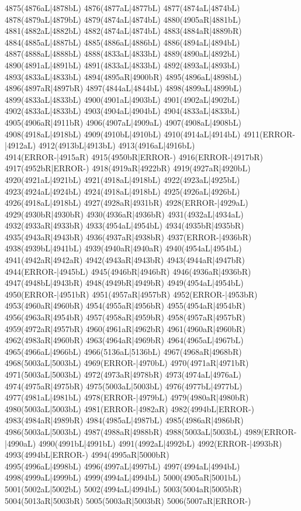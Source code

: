 4875(4876aL|4878bL) 4876(4877aL|4877bL) 4877(4874aL|4874bL) \\4878(4879aL|4879bL) 4879(4874aL|4874bL) 4880(4905aR|4881bL) 4881(4882aL|4882bL) 4882(4874aL|4874bL) 4883(4884aR|4889bR) 4884(4885aL|4887bL) 4885(4886aL|4886bL) 4886(4894aL|4894bL) \\4887(4888aL|4888bL) 4888(4833aL|4833bL) 4889(4890aL|4892bL) 4890(4891aL|4891bL) 4891(4833aL|4833bL) 4892(4893aL|4893bL) 4893(4833aL|4833bL) 4894(4895aR|4900bR) 4895(4896aL|4898bL) \\4896(4897aR|4897bR) 4897(4844aL|4844bL) 4898(4899aL|4899bL) 4899(4833aL|4833bL) 4900(4901aL|4903bL) 4901(4902aL|4902bL) 4902(4833aL|4833bL) 4903(4904aL|4904bL) 4904(4833aL|4833bL) \\4905(4906aR|4911bR) 4906(4907aL|4909aL) 4907(4908aL|4908bL) 4908(4918aL|4918bL) 4909(4910bL|4910bL) 4910(4914aL|4914bL) 4911(ERROR-|4912aL) 4912(4913bL|4913bL) 4913(4916aL|4916bL) \\4914(ERROR-|4915aR) 4915(4950bR|ERROR-) 4916(ERROR-|4917bR) 4917(4952bR|ERROR-) 4918(4919aR|4922bR) 4919(4927aR|4920bL) 4920(4921aL|4921bL) 4921(4918aL|4918bL) 4922(4923aL|4925bL) \\4923(4924aL|4924bL) 4924(4918aL|4918bL) 4925(4926aL|4926bL) 4926(4918aL|4918bL) 4927(4928aR|4931bR) 4928(ERROR-|4929aL) 4929(4930bR|4930bR) 4930(4936aR|4936bR) 4931(4932aL|4934aL) \\4932(4933aR|4933bR) 4933(4954aL|4954bL) 4934(4935bR|4935bR) 4935(4943aR|4943bR) 4936(4937aR|4938bR) 4937(ERROR-|4936bR) 4938(4939bL|4941bL) 4939(4940aR|4940aR) 4940(4954aL|4954bL) \\4941(4942aR|4942aR) 4942(4943aR|4943bR) 4943(4944aR|4947bR) 4944(ERROR-|4945bL) 4945(4946bR|4946bR) 4946(4936aR|4936bR) 4947(4948bL|4943bR) 4948(4949bR|4949bR) 4949(4954aL|4954bL) \\4950(ERROR-|4951bR) 4951(4957aR|4957bR) 4952(ERROR-|4953bR) 4953(4960aR|4960bR) 4954(4955aR|4956bR) 4955(4954aR|4954bR) 4956(4963aR|4954bR) 4957(4958aR|4959bR) 4958(4957aR|4957bR) \\4959(4972aR|4957bR) 4960(4961aR|4962bR) 4961(4960aR|4960bR) 4962(4983aR|4960bR) 4963(4964aR|4969bR) 4964(4965aL|4967bL) 4965(4966aL|4966bL) 4966(5136aL|5136bL) 4967(4968aR|4968bR) \\4968(5003aL|5003bL) 4969(ERROR-|4970bL) 4970(4971aR|4971bR) 4971(5003aL|5003bL) 4972(4973aR|4978bR) 4973(4974aL|4976aL) 4974(4975aR|4975bR) 4975(5003aL|5003bL) 4976(4977bL|4977bL) \\4977(4981aL|4981bL) 4978(ERROR-|4979bL) 4979(4980aR|4980bR) 4980(5003aL|5003bL) 4981(ERROR-|4982aR) 4982(4994bL|ERROR-) 4983(4984aR|4989bR) 4984(4985aL|4987bL) 4985(4986aR|4986bR) \\4986(5003aL|5003bL) 4987(4988aR|4988bR) 4988(5003aL|5003bL) 4989(ERROR-|4990aL) 4990(4991bL|4991bL) 4991(4992aL|4992bL) 4992(ERROR-|4993bR) 4993(4994bL|ERROR-) 4994(4995aR|5000bR) \\4995(4996aL|4998bL) 4996(4997aL|4997bL) 4997(4994aL|4994bL) 4998(4999aL|4999bL) 4999(4994aL|4994bL) 5000(4905aR|5001bL) 5001(5002aL|5002bL) 5002(4994aL|4994bL) 5003(5004aR|5005bR) \\5004(5013aR|5003bR) 5005(5003aR|5003bR) 5006(5007aR|ERROR-) 